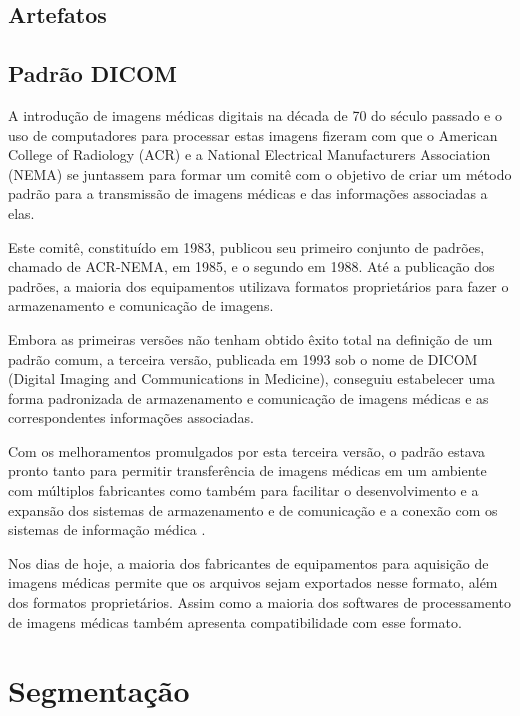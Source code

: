 \subsection{Artefatos}


\subsection{Padrão DICOM}

A introdução de imagens médicas digitais na década de 70 do século passado e o uso de computadores para processar estas imagens fizeram com que o American College of Radiology (ACR) e a National Electrical Manufacturers Association (NEMA) se juntassem para formar um comitê com o objetivo de criar um método padrão para a transmissão de imagens médicas e das informações associadas a elas.

Este comitê, constituído em 1983, publicou seu primeiro conjunto de padrões, chamado de ACR-NEMA, em 1985, e o segundo em 1988. Até a publicação dos padrões, a maioria dos equipamentos utilizava formatos proprietários para fazer o armazenamento e comunicação de imagens.

Embora as primeiras versões não tenham obtido êxito total na definição de um padrão comum, a terceira versão, publicada em 1993 sob o nome de DICOM (Digital Imaging and Communications in Medicine), conseguiu estabelecer uma forma padronizada de armazenamento e comunicação de imagens médicas e as correspondentes informações associadas.

Com os melhoramentos promulgados por esta terceira versão, o padrão estava pronto tanto para permitir transferência de imagens médicas em um ambiente com múltiplos fabricantes como também para facilitar o desenvolvimento e a expansão dos sistemas de armazenamento e de comunicação e a conexão com os sistemas de informação médica \cite{nema}.

Nos dias de hoje, a maioria dos fabricantes de equipamentos para aquisição de imagens médicas permite que os arquivos sejam exportados nesse formato, além dos formatos proprietários. Assim como a maioria dos softwares de processamento de imagens médicas também apresenta compatibilidade com esse formato.

\section{Segmentação}

